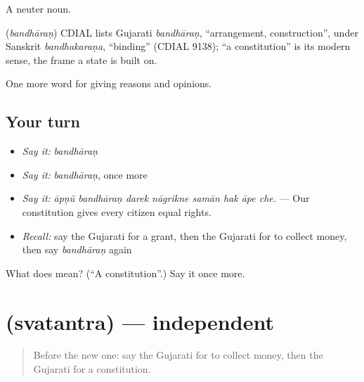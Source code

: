 A neuter noun.

\begin{cousinweb}
\textbf{} (\emph{bandhāraṇ}) CDIAL lists Gujarati \emph{bandhāraṇ}, \textquotedblleft{}arrangement, construction\textquotedblright{}, under Sanskrit \emph{bandhakaraṇa}, \textquotedblleft{}binding\textquotedblright{} (CDIAL 9138); \textquotedblleft{}a constitution\textquotedblright{} is its modern sense, the frame a state is built on.
\end{cousinweb}

\begin{grammarlens}[title={What you've built}]
One more word for giving reasons and opinions.
\end{grammarlens}

\subsection*{Your turn}
\begin{itemize}
\raggedright
  \item \emph{Say it:} \emph{bandhāraṇ}
  \item \emph{Say it:} \emph{bandhāraṇ}, once more
  \item \emph{Say it:} \emph{āpṇũ bandhāraṇ darek nāgrikne samān hak āpe che.} — Our constitution gives every citizen equal rights.
  \item \emph{Recall:} say the Gujarati for a grant, then the Gujarati for to collect money, then say \emph{bandhāraṇ} again
\end{itemize}

\begin{tcolorbox}[breakable,colback=teal!4,colframe=teal!35!black,title={Before you move on}]
What does  mean? (\textquotedblleft{}A constitution\textquotedblright{}.) Say it once more.
\end{tcolorbox}
\section[\texorpdfstring{\gu{સ્વતંત્ર} (svatantra)}{સ્વતંત્ર (svatantra)}]{ (svatantra) — independent}

\label{lesson:GU-C356-svatantra}



\begin{quote}
Before the new one: say the Gujarati for to collect money, then the Gujarati for a constitution.
\end{quote}

